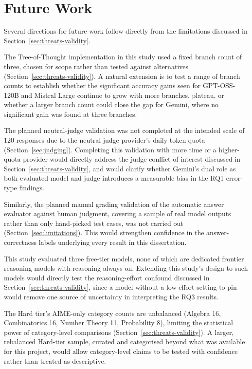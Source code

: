 \section{Future Work}

Several directions for future work follow directly from the limitations
discussed in Section~\ref{sec:threats-validity}.

The Tree-of-Thought implementation in this study used a fixed branch
count of three, chosen for scope rather than tested against alternatives
(Section~\ref{sec:threats-validity}). A natural extension is to test a
range of branch counts to establish whether the significant accuracy
gains seen for GPT-OSS-120B and Mistral Large continue to grow with more
branches, plateau, or whether a larger branch count could close the gap
for Gemini, where no significant gain was found at three branches.

The planned neutral-judge validation was not completed at the intended
scale of 120 responses due to the neutral judge provider's daily token
quota (Section~\ref{sec:judging}). Completing this validation with more
time or a higher-quota provider would directly address the judge
conflict of interest discussed in Section~\ref{sec:threats-validity},
and would clarify whether Gemini's dual role as both evaluated model and
judge introduces a measurable bias in the RQ1 error-type findings.

Similarly, the planned manual grading validation of the automatic answer
evaluator against human judgment, covering a sample of real model
outputs rather than only hand-picked test cases, was not carried out
(Section~\ref{sec:limitations}). This would strengthen confidence in the
answer-correctness labels underlying every result in this dissertation.

This study evaluated three free-tier models, none of which are dedicated
frontier reasoning models with reasoning always on. Extending this
study's design to such models would directly test the reasoning-effort
confound discussed in Section~\ref{sec:threats-validity}, since a model
without a low-effort setting to pin would remove one source of
uncertainty in interpreting the RQ3 results.

The Hard tier's AIME-only category counts are unbalanced (Algebra 16,
Combinatorics 16, Number Theory 11, Probability 8), limiting the
statistical power of category-level comparisons
(Section~\ref{sec:threats-validity}). A larger, rebalanced Hard-tier
sample, curated and categorised beyond what was available for this
project, would allow category-level claims to be tested with confidence
rather than treated as descriptive.

